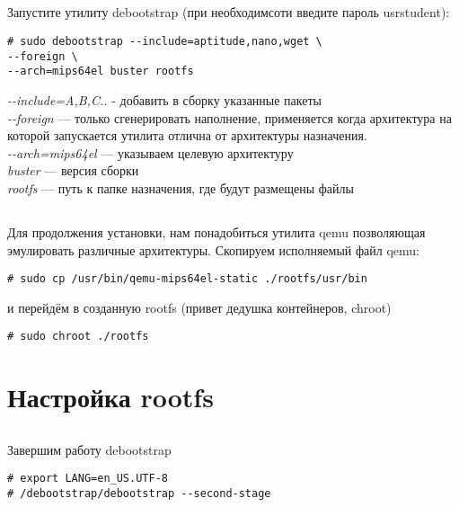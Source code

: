 \subsection{} Запустите утилиту debootstrap (при необходимсоти введите пароль usrstudent):
\begin{lstlisting}[style=bash]
# sudo debootstrap --include=aptitude,nano,wget \
--foreign \
--arch=mips64el buster rootfs
\end{lstlisting}
\textit{-{}-include=A,B,C..} - добавить в сборку указанные пакеты \\
\textit{-{}-foreign} — только сгенерировать наполнение, применяется когда архитектура на которой запускается утилита отлична от архитектуры назначения. \\
\textit{-{}-arch=mips64el} — указываем целевую архитектуру \\
\textit{buster} — версия сборки \\
\textit{rootfs} — путь к папке назначения, где будут размещены файлы \\

\subsection{} Для продолжения установки, нам понадобиться утилита qemu позволяющая эмулировать различные архитектуры. Скопируем исполняемый файл qemu:
\begin{lstlisting}[style=bash]
# sudo cp /usr/bin/qemu-mips64el-static ./rootfs/usr/bin
\end{lstlisting}
и перейдём в созданную rootfs (привет дедушка контейнеров, chroot)
\begin{lstlisting}[style=bash]
# sudo chroot ./rootfs
\end{lstlisting}



\section{Настройка rootfs}

\subsection{} Завершим работу debootstrap
\begin{lstlisting}[style=bash]
# export LANG=en_US.UTF-8
# /debootstrap/debootstrap --second-stage
\end{lstlisting}

